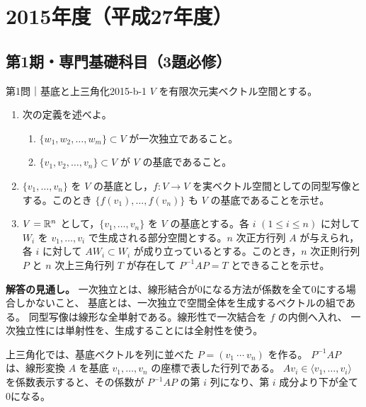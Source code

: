 \chapter{2015年度（平成27年度）}
\label{ch:2015}

\section{第1期・専門基礎科目（3題必修）}

\begin{problem}{第1問｜基底と上三角化}{2015-b-1}
$V$ を有限次元実ベクトル空間とする。
\begin{enumerate}
  \item[(1)] 次の定義を述べよ。
  \begin{enumerate}
    \item[(i)] $\{w_1,w_2,\ldots,w_m\}\subset V$ が一次独立であること。
    \item[(ii)] $\{v_1,v_2,\ldots,v_n\}\subset V$ が $V$ の基底であること。
  \end{enumerate}
  \item[(2)] $\{v_1,\ldots,v_n\}$ を $V$ の基底とし，$f:V\to V$ を実ベクトル空間としての同型写像とする。このとき $\{f(v_1),\ldots,f(v_n)\}$ も $V$ の基底であることを示せ。
  \item[(3)] $V=\mathbb{R}^n$ として，$\{v_1,\ldots,v_n\}$ を $V$ の基底とする。各 $i$ $(1\le i\le n)$ に対して $W_i$ を $v_1,\ldots,v_i$ で生成される部分空間とする。$n$ 次正方行列 $A$ が与えられ，各 $i$ に対して $AW_i\subset W_i$ が成り立っているとする。このとき，$n$ 次正則行列 $P$ と $n$ 次上三角行列 $T$ が存在して $P^{-1}AP=T$ とできることを示せ。
\end{enumerate}
\end{problem}
\begin{memo*}
\textbf{解答の見通し。}
一次独立とは、線形結合が0になる方法が係数を全て0にする場合しかないこと、
基底とは、一次独立で空間全体を生成するベクトルの組である。
同型写像は線形な全単射である。線形性で一次結合を $f$ の内側へ入れ、
一次独立性には単射性を、生成することには全射性を使う。

上三角化では、基底ベクトルを列に並べた $P=(v_1\ \cdots\ v_n)$ を作る。
$P^{-1}AP$ は、線形変換 $A$ を基底 $v_1,\ldots,v_n$ の座標で表した行列である。
$Av_i\in\langle v_1,\ldots,v_i\rangle$ を係数表示すると、その係数が
$P^{-1}AP$ の第 $i$ 列になり、第 $i$ 成分より下が全て0になる。
\end{memo*}
